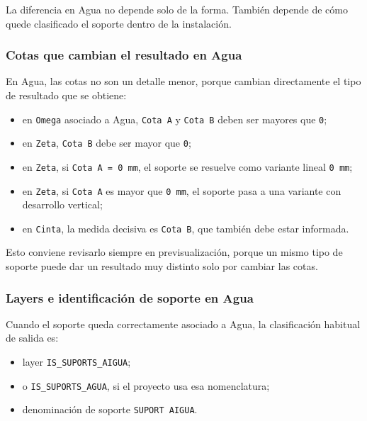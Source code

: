 La diferencia en Agua no depende solo de la forma. También depende de cómo quede clasificado el soporte dentro de la instalación.

\subsubsection{Cotas que cambian el resultado en Agua}

En Agua, las cotas no son un detalle menor, porque cambian directamente el tipo de resultado que se obtiene:

\begin{itemize}
\item en \texttt{Omega} asociado a Agua, \texttt{Cota A} y \texttt{Cota B} deben ser mayores que \texttt{0};
\item en \texttt{Zeta}, \texttt{Cota B} debe ser mayor que \texttt{0};
\item en \texttt{Zeta}, si \texttt{Cota A = 0 mm}, el soporte se resuelve como variante lineal \texttt{0 mm};
\item en \texttt{Zeta}, si \texttt{Cota A} es mayor que \texttt{0 mm}, el soporte pasa a una variante con desarrollo vertical;
\item en \texttt{Cinta}, la medida decisiva es \texttt{Cota B}, que también debe estar informada.
\end{itemize}

Esto conviene revisarlo siempre en previsualización, porque un mismo tipo de soporte puede dar un resultado muy distinto solo por cambiar las cotas.


\subsubsection{Layers e identificación de soporte en Agua}

Cuando el soporte queda correctamente asociado a Agua, la clasificación habitual de salida es:

\begin{itemize}
\item layer \texttt{IS\_SUPORTS\_AIGUA};
\item o \texttt{IS\_SUPORTS\_AGUA}, si el proyecto usa esa nomenclatura;
\item denominación de soporte \texttt{SUPORT AIGUA}.
\end{itemize}

